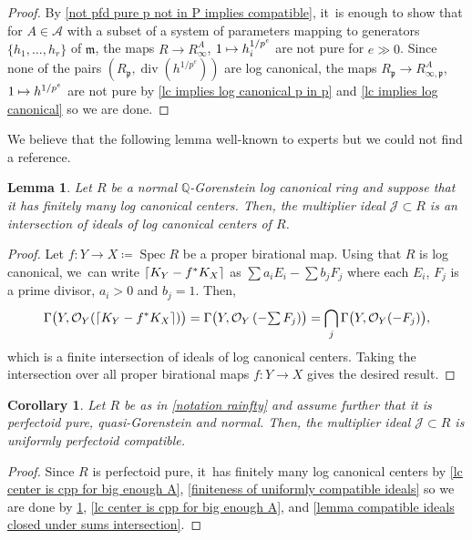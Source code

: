 \documentclass[11pt]{article}
\let\autoref\cref
\newcommand\mto{\mathchoice{\longmapsto}{\mapsto}{\mapsto}{\mapsto}}
\theoremstyle{plain}
\newtheorem{corollary}[theorem]{Corollary}
\newtheorem{lemma}[theorem]{Lemma}
\theoremstyle{definition}
\numberwithin{equation}{theorem}
\newcommand{\Q}{\mathbb {Q}}
\newcommand{\fram}{\mathfrak{m}}
\newcommand{\p}{\mathfrak{p}}
\DeclareMathOperator{\Div}{{div}}
\DeclareMathOperator{\Spec}{{Spec}}
\DeclarePairedDelimiter\ceil{\lceil}{\rceil}
\newcommand{\sA}{\mathcal{A}}
\newcommand{\sJ}{\mathcal{J}}
\newcommand{\sO}{\mathcal{O}}
\newcommand{\unpe}{{1/{p^e}}}
\begin{document}
\begin{proof}
By \autoref{not pfd pure p not in P implies compatible}, it~is enough to show that for $A\in \sA$ with a subset of a system of parameters mapping to generators $\{h_1,\ldots,h_r\}$ of $\fram$, the maps $R\to R^A_{\infty}$, $1\mto h_i^\unpe$ are not pure for $e\gg 0$. Since none of the pairs $(R_\p, \Div(h^{\unpe}))$ are log canonical, the maps $R_\p\to R^A_{\infty,\p}$, $1\mto h^\unpe$ are not pure by \autoref{lc implies log canonical p in p} and \autoref{lc implies log canonical} so we are done.
\end{proof}

We believe that the following lemma well-known to experts but we could not find a reference.
\begin{lemma}\label{multiplier ideal is intersection lc centers}
Let $R$ be a normal $\Q$-Gorenstein log canonical ring and suppose that it has finitely many log canonical centers. Then, the multiplier ideal $\sJ\subset R$ is an intersection of ideals of log canonical centers of $R$.
\end{lemma}

\begin{proof}
Let $f\colon Y\to X\coloneqq \Spec R$ be a proper birational map. Using that $R$ is log canonical, we~can write $\ceil{K_Y-f^* K_X}$ as $\sum a_i E_i - \sum b_j F_j$ where each $E_i$, $F_j$ is a prime divisor,
$a_i>0$ and $b_j=1$. Then,
\[\Gamma\bigl(Y,\sO_Y(\ceil{K_Y-f^* K_X})\bigr)=\Gamma\bigl(Y,\sO_Y\left( - {\textstyle\sum F_j}\right)\bigr)=\bigcap_j \Gamma\bigl(Y,\sO_Y( - F_j)\bigl),
\]
which is a finite intersection of ideals of log canonical centers. Taking the intersection over all proper birational maps $f\colon Y\to X$ gives the desired result.
\end{proof}

\begin{corollary}\label{multiplier ideal uniformly compatible}
Let $R$ be as in \autoref{notation rainfty} and assume further that it is perfectoid pure, quasi-Gorenstein and normal. Then, the multiplier ideal $\sJ\subset R$ is uniformly perfectoid compatible.
\end{corollary}

\begin{proof}
Since $R$ is perfectoid pure, it~has finitely many log canonical centers by \autoref{lc center is cpp for big enough A}, \autoref{finiteness of uniformly compatible ideals} so we are done by \autoref{multiplier ideal is intersection lc centers}, \autoref{lc center is cpp for big enough A}, and \autoref{lemma compatible ideals closed under sums intersection}.
\end{proof}
\end{document}
